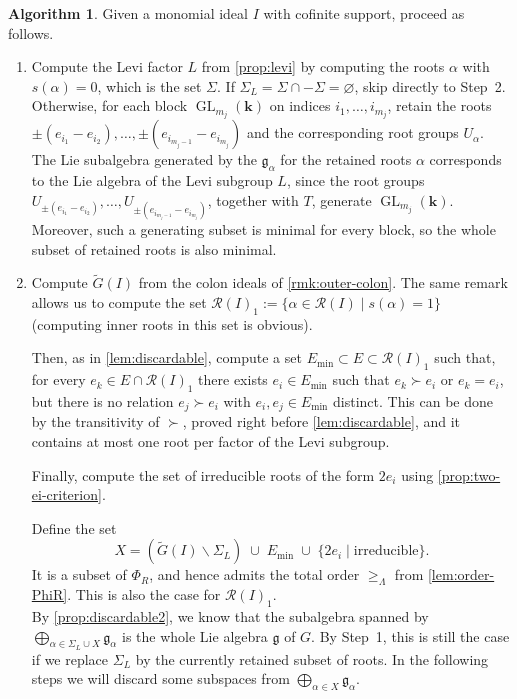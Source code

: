 \documentclass[11pt,letterpaper,reqno]{amsart}
\theoremstyle{remark}
\theoremstyle{definition}
\newtheorem{algorithm}[algorithm]{Algorithm}
\newcommand{\KK}[0]{\ensuremath{\mathbf{k}}}
\newcommand{\GL}[0]{\ensuremath{\operatorname{GL}}}
\newcommand{\R}{\mathcal R}
\begin{document}
\begin{algorithm}\label{strategy:generators}
Given a monomial ideal $I$ with cofinite support, proceed as follows.
\begin{enumerate}
\item[\textup{Step~1.}] Compute the Levi factor $L$ from \cref{prop:levi} by computing the roots $\alpha$ with $s(\alpha)=0$, which is the set $\Sigma$. If $\Sigma_L=\Sigma\cap-\Sigma=\varnothing$, skip directly to Step~2. Otherwise, for each block $\GL_{m_j}(\KK)$ on indices $i_1,\dots,i_{m_j}$, retain the roots $\pm(e_{i_1}-e_{i_2}),\dots,\pm(e_{i_{m_j-1}}-e_{i_{m_j}})$ and the corresponding root groups $U_\alpha$.\\

The Lie subalgebra generated by the $\mathfrak g_\alpha$ for the retained roots $\alpha$ corresponds to the Lie algebra of the Levi subgroup $L$, since the root groups $U_{\pm(e_{i_1}-e_{i_2})},\dots,U_{\pm(e_{i_{m_j-1}}-e_{i_{m_j}})}$, together with $T$, generate $\GL_{m_j}(\KK)$. Moreover, such a generating subset is minimal for every block, so the whole subset of retained roots is also minimal.\\

\item[\textup{Step~2.}] Compute $\widetilde G(I)$ from the colon ideals of \cref{rmk:outer-colon}. The same remark allows us to compute the set $\mathcal R(I)_1:=\{\alpha\in\mathcal R(I)\mid s(\alpha)=1\}$ (computing inner roots in this set is obvious).

Then, as in \cref{lem:discardable}, compute a set $E_\mathrm{min}\subset E\subset\R(I)_1$ such that, for every $e_k\in E\cap\R(I)_1$ there exists $e_i\in E_\mathrm{min}$ such that $e_k\succ e_i$ or $e_k=e_i$, but there is no relation $e_j\succ e_i$ with $e_i,e_j\in E_{\mathrm{min}}$ distinct. This can be done by the transitivity of $\succ$, proved right before \cref{lem:discardable}, and it contains at most one root per factor of the Levi subgroup.

Finally, compute the set of irreducible roots of the form $2e_i$ using \cref{prop:two-ei-criterion}.

Define the set
\[X = (\widetilde G(I)\smallsetminus\Sigma_L)\;\cup\; E_{\mathrm{min}}\;\cup\;\{2e_i\mid \text{irreducible}\}.\]
It is a subset of $\Phi_R$, and hence admits the total order $\geq_\Lambda$ from \cref{lem:order-PhiR}. This is also the case for $\mathcal R(I)_1$.\\

By \cref{prop:discardable2}, we know that the subalgebra spanned by $\bigoplus_{\alpha\in \Sigma_L\cup X} \mathfrak g_\alpha$ is the whole Lie algebra $\mathfrak g$ of $G$. By Step~1, this is still the case if we replace $\Sigma_L$ by the currently retained subset of roots. In the following steps we will discard some subspaces from $\bigoplus_{\alpha\in X} \mathfrak g_\alpha$.\\


\end{enumerate}
\end{algorithm}
\end{document}
